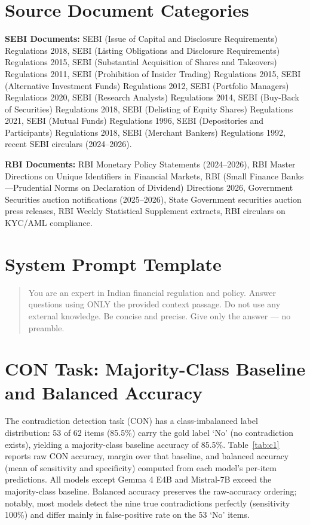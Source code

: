 \documentclass[11pt]{article}
\begin{document}


\appendix

\section{Source Document Categories}
\label{app:sourcedocs}

\textbf{SEBI Documents:} SEBI (Issue of Capital and Disclosure Requirements) Regulations 2018, SEBI (Listing Obligations and Disclosure Requirements) Regulations 2015, SEBI (Substantial Acquisition of Shares and Takeovers) Regulations 2011, SEBI (Prohibition of Insider Trading) Regulations 2015, SEBI (Alternative Investment Funds) Regulations 2012, SEBI (Portfolio Managers) Regulations 2020, SEBI (Research Analysts) Regulations 2014, SEBI (Buy-Back of Securities) Regulations 2018, SEBI (Delisting of Equity Shares) Regulations 2021, SEBI (Mutual Funds) Regulations 1996, SEBI (Depositories and Participants) Regulations 2018, SEBI (Merchant Bankers) Regulations 1992, recent SEBI circulars (2024--2026).

\textbf{RBI Documents:} RBI Monetary Policy Statements (2024--2026), RBI Master Directions on Unique Identifiers in Financial Markets, RBI (Small Finance Banks---Prudential Norms on Declaration of Dividend) Directions 2026, Government Securities auction notifications (2025--2026), State Government securities auction press releases, RBI Weekly Statistical Supplement extracts, RBI circulars on KYC/AML compliance.

\section{System Prompt Template}
\label{app:prompt}

\begin{quote}
\noindent You are an expert in Indian financial regulation and policy. Answer questions using ONLY the provided context passage. Do not use any external knowledge. Be concise and precise. Give only the answer --- no preamble.
\end{quote}

\section{CON Task: Majority-Class Baseline and Balanced Accuracy}
\label{app:con}

The contradiction detection task (CON) has a class-imbalanced label distribution: 53 of 62 items (85.5\%) carry the gold label `No' (no contradiction exists), yielding a majority-class baseline accuracy of 85.5\%. Table~\ref{tab:c1} reports raw CON accuracy, margin over that baseline, and balanced accuracy (mean of sensitivity and specificity) computed from each model's per-item predictions. All models except Gemma 4 E4B and Mistral-7B exceed the majority-class baseline. Balanced accuracy preserves the raw-accuracy ordering; notably, most models detect the nine true contradictions perfectly (sensitivity 100\%) and differ mainly in false-positive rate on the 53 `No' items.
\end{document}
